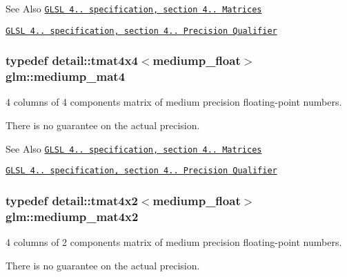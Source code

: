 \begin{DoxySeeAlso}{See Also}
\href{http://www.opengl.org/registry/doc/GLSLangSpec.4.20.8.pdf}{\tt G\-L\-S\-L 4.. specification, section 4.. Matrices} 

\href{http://www.opengl.org/registry/doc/GLSLangSpec.4.20.8.pdf}{\tt G\-L\-S\-L 4.. specification, section 4.. Precision Qualifier} 
\end{DoxySeeAlso}
\hypertarget{group__core__precision_gabd9b3a319a914cd49dab821d4dbc93d4}{
\subsubsection[{mediump\-\_\-mat4}]{\setlength{\rightskip}{0pt plus 5cm}typedef detail\-::tmat4x4$<$mediump\-\_\-float$>$ {\bf glm\-::mediump\-\_\-mat4}}}\label{group__core__precision_gabd9b3a319a914cd49dab821d4dbc93d4}


4 columns of 4 components matrix of medium precision floating-\/point numbers. 

There is no guarantee on the actual precision.

\begin{DoxySeeAlso}{See Also}
\href{http://www.opengl.org/registry/doc/GLSLangSpec.4.20.8.pdf}{\tt G\-L\-S\-L 4.. specification, section 4.. Matrices} 

\href{http://www.opengl.org/registry/doc/GLSLangSpec.4.20.8.pdf}{\tt G\-L\-S\-L 4.. specification, section 4.. Precision Qualifier} 
\end{DoxySeeAlso}
\hypertarget{group__core__precision_gad8c4b5a61db5087e32506b2022442edd}{
\subsubsection[{mediump\-\_\-mat4x2}]{\setlength{\rightskip}{0pt plus 5cm}typedef detail\-::tmat4x2$<$mediump\-\_\-float$>$ {\bf glm\-::mediump\-\_\-mat4x2}}}\label{group__core__precision_gad8c4b5a61db5087e32506b2022442edd}


4 columns of 2 components matrix of medium precision floating-\/point numbers. 

There is no guarantee on the actual precision.

